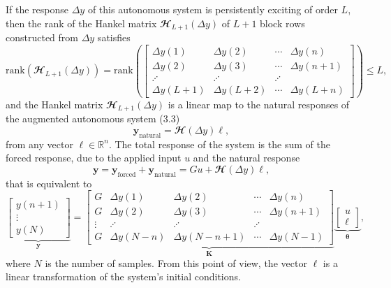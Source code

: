 \documentclass[11pt]{article}
\begin{document}
\begin{itemize}
    If the response $\Delta {y}$  of this autonomous system is persistently exciting of order $L$, then the rank of the Hankel matrix $\mathbfcal{H}_{L+1}(\Delta {y})$ of $L+1$ block rows constructed from $\Delta {y}$ satisfies
    \begin{equation} \tag{3.11} \mathrm{rank} \left( \mathbfcal{H}_{L+1} \left( \Delta {y} \right) \right) = \mathrm{rank} \left( \begin{bmatrix} \Delta y(1) & \Delta y(2) & \cdots & \Delta y(n) \\ \Delta y(2) & \Delta y(3) & \cdots & \Delta y(n+1) \\ \iddots & \iddots & \iddots \\ \Delta y(L+1) & \Delta y(L+2) & \cdots & \Delta y(L+n) \end{bmatrix} \right) \leq L,  \end{equation}
    and the Hankel matrix $\mathbfcal{H}_{L+1}(\Delta {y})$ is a linear map to the natural responses of the augmented autonomous system (3.3) 
    \begin{equation} \tag{3.12} \mathbf{y}_{\mathrm{natural}} = \mathbfcal{H}\left(\Delta {y}\right) \bm{\ell}, \end{equation}
    from any vector $\bm{\ell} \in \mathbb{R}^{n}$.
    The total response of the system is the sum of the forced response, due to the applied input ${u}$ and the natural response
    \begin{equation} \tag{3.13} \mathbf{y} = \mathbf{y}_{\mathrm{forced}}+ \mathbf{y}_{\mathrm{natural}} =G {u} + \mathbfcal{H}\left(\Delta {y}\right) \bm{\ell} ,  \end{equation} 
    that is equivalent to
    \begin{equation} \tag{3.14} \underbrace{ \begin{bmatrix} y(n+1) \\ \vdots \\ y(N) \end{bmatrix}}_{\mathbf{y}} = \underbrace{ \begin{bmatrix} G & \Delta y(1) & \Delta y(2) & \cdots & \Delta y(n) \\ G & \Delta y(2) & \Delta y(3) & \cdots & \Delta y(n+1) \\ \vdots & \iddots & \iddots & \iddots \\ G & \Delta y(N-n) & \Delta y(N-n+1) & \cdots & \Delta y(N-1) \end{bmatrix} }_{\mathbf{K}} \underbrace{ \begin{bmatrix} {{u}} \\ \bm{\ell} \end{bmatrix} }_{\bm{\theta}} , \label{eqn:ddsiemexd} \end{equation}
    where $N$ is the number of samples.
    From this point of view, the vector $\bm{\ell}$ is a linear transformation of the system's initial conditions.  
    \color{black}
    

\end{itemize}
\end{document}
